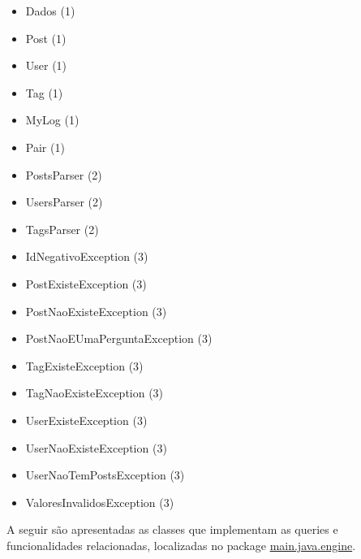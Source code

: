 \documentclass[11pt,a4paper]{article}
\begin{document}
\begin{itemize}
	\item Dados                            (1)
	\item Post                             (1)
	\item User                             (1)
	\item Tag           	               (1)
	\item MyLog           	               (1)
	\item Pair           	               (1)
	\item PostsParser                      (2)
	\item UsersParser                      (2)
	\item TagsParser    	               (2)
	\item IdNegativoException              (3)
	\item PostExisteException              (3)
	\item PostNaoExisteException           (3)
	\item PostNaoEUmaPerguntaException     (3)
	\item TagExisteException               (3)
    \item TagNaoExisteException            (3)
    \item UserExisteException              (3)
    \item UserNaoExisteException           (3)
    \item UserNaoTemPostsException         (3)
    \item ValoresInvalidosException        (3)
\end{itemize}

A seguir são apresentadas as classes que implementam as queries e funcionalidades relacionadas, localizadas no package \underline{main.java.engine}.\newline
\end{document}

